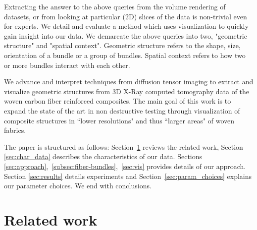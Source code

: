 Extracting the answer to the above queries from the volume rendering of datasets, or from looking at  particular (2D) slices of the data is non-trivial even for experts. We detail and evaluate a method which uses visualization to quickly gain insight into our data. We demarcate the above queries into two, "geometric structure" and "spatial context". Geometric structure refers to the shape, size, orientation of a bundle or a group of bundles. Spatial context refers to how two or more bundles interact with each other. 

We advance and interpret techniques from diffusion tensor imaging to extract and visualize geometric structures from 3D X-Ray computed tomography data of the woven carbon fiber reinforced composites.
The main goal of this work is to expand the state of the art in non destructive testing through visualization of composite structures in ``lower resolutions" and thus ``larger areas" of woven fabrics.

The paper is structured as follows: Section~\ref{sec:prev_work} reviews the related work,  Section \ref{sec:char_data} describes the   characteristics of our data. Sections \ref{sec:approach},~\ref{subsec:fiber-bundles},~\ref{sec:vis} provides details of our approach. Section \ref{sec:results} details experiments and Section~\ref{sec:param_choices} explains our  parameter choices. We end with conclusions.

\section {Related work}
\label{sec:prev_work}


